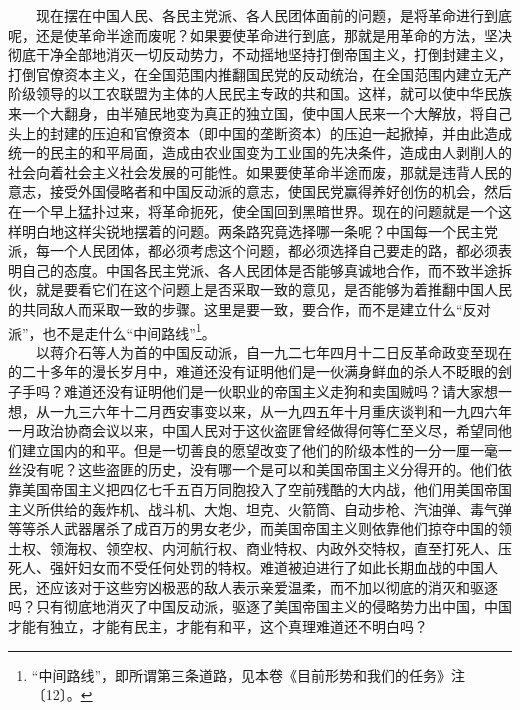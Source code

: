 \documentclass[cn,11pt,chinese]{elegantbook}
\begin{document}
　　现在摆在中国人民、各民主党派、各人民团体面前的问题，是将革命进行到底呢，还是使革命半途而废呢？如果要使革命进行到底，那就是用革命的方法，坚决彻底干净全部地消灭一切反动势力，不动摇地坚持打倒帝国主义，打倒封建主义，打倒官僚资本主义，在全国范围内推翻国民党的反动统治，在全国范围内建立无产阶级领导的以工农联盟为主体的人民民主专政的共和国。这样，就可以使中华民族来一个大翻身，由半殖民地变为真正的独立国，使中国人民来一个大解放，将自己头上的封建的压迫和官僚资本（即中国的垄断资本）的压迫一起掀掉，并由此造成统一的民主的和平局面，造成由农业国变为工业国的先决条件，造成由人剥削人的社会向着社会主义社会发展的可能性。如果要使革命半途而废，那就是违背人民的意志，接受外国侵略者和中国反动派的意志，使国民党赢得养好创伤的机会，然后在一个早上猛扑过来，将革命扼死，使全国回到黑暗世界。现在的问题就是一个这样明白地这样尖锐地摆着的问题。两条路究竟选择哪一条呢？中国每一个民主党派，每一个人民团体，都必须考虑这个问题，都必须选择自己要走的路，都必须表明自己的态度。中国各民主党派、各人民团体是否能够真诚地合作，而不致半途拆伙，就是要看它们在这个问题上是否采取一致的意见，是否能够为着推翻中国人民的共同敌人而采取一致的步骤。这里是要一致，要合作，而不是建立什么“反对派”，也不是走什么“中间路线”\footnote[5]{ “中间路线”，即所谓第三条道路，见本卷《目前形势和我们的任务》注〔12〕。}。\\
　　以蒋介石等人为首的中国反动派，自一九二七年四月十二日反革命政变至现在的二十多年的漫长岁月中，难道还没有证明他们是一伙满身鲜血的杀人不眨眼的刽子手吗？难道还没有证明他们是一伙职业的帝国主义走狗和卖国贼吗？请大家想一想，从一九三六年十二月西安事变以来，从一九四五年十月重庆谈判和一九四六年一月政治协商会议以来，中国人民对于这伙盗匪曾经做得何等仁至义尽，希望同他们建立国内的和平。但是一切善良的愿望改变了他们的阶级本性的一分一厘一毫一丝没有呢？这些盗匪的历史，没有哪一个是可以和美国帝国主义分得开的。他们依靠美国帝国主义把四亿七千五百万同胞投入了空前残酷的大内战，他们用美国帝国主义所供给的轰炸机、战斗机、大炮、坦克、火箭筒、自动步枪、汽油弹、毒气弹等等杀人武器屠杀了成百万的男女老少，而美国帝国主义则依靠他们掠夺中国的领土权、领海权、领空权、内河航行权、商业特权、内政外交特权，直至打死人、压死人、强奸妇女而不受任何处罚的特权。难道被迫进行了如此长期血战的中国人民，还应该对于这些穷凶极恶的敌人表示亲爱温柔，而不加以彻底的消灭和驱逐吗？只有彻底地消灭了中国反动派，驱逐了美国帝国主义的侵略势力出中国，中国才能有独立，才能有民主，才能有和平，这个真理难道还不明白吗？\\
\end{document}
